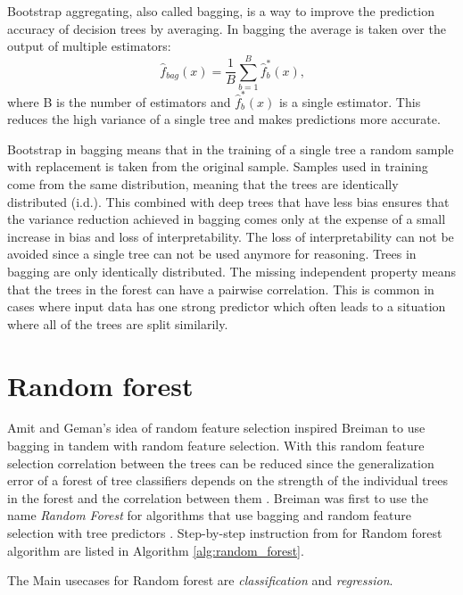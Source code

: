Bootstrap aggregating, also called bagging, is a way to improve the prediction accuracy of decision trees by averaging. In bagging the average is taken over the output of multiple estimators:
\begin{equation}
    \hat {f}_{bag}(x) = \frac{1}{B}\sum_{b = 1}^{B} \hat {f}^{*}_{b}(x) \text{,}
\end{equation}
where B is the number of estimators and $\hat {f}^{*}_{b}(x)$ is a single estimator. This reduces the high variance of a single tree and makes predictions more accurate.

Bootstrap in bagging means that in the training of a single tree a random sample with replacement is taken from the original sample. Samples used in training come from the same distribution, meaning that the trees are identically distributed (i.d.). This combined with deep trees that have less bias ensures that the variance reduction achieved in bagging comes only at the expense of a small increase in bias and loss of interpretability. The loss of interpretability can not be avoided since a single tree can not be used anymore for reasoning. Trees in bagging are only identically distributed. The missing independent property means that the trees in the forest can have a pairwise correlation. This is common in cases where input data has one strong predictor which often leads to a situation where all of the trees are split similarily. \cite{friedman2001elements}

\section{Random forest}
Amit and Geman's \cite{amit1997shape} idea of random feature selection inspired Breiman to use bagging in tandem with random feature selection. With this random feature selection correlation between the trees can be reduced since the generalization error of a forest of tree classifiers depends on the strength of the individual trees in the forest and the correlation between them \cite{breiman2001random}. Breiman was first to use the name \textit{Random Forest} for algorithms that use bagging and random feature selection with tree predictors \cite{breiman2001random}. Step-by-step instruction from \cite{friedman2001elements} for Random forest algorithm are listed in Algorithm \ref{alg:random_forest}.

The Main usecases for Random forest are \textit{classification} and \textit{regression}.

